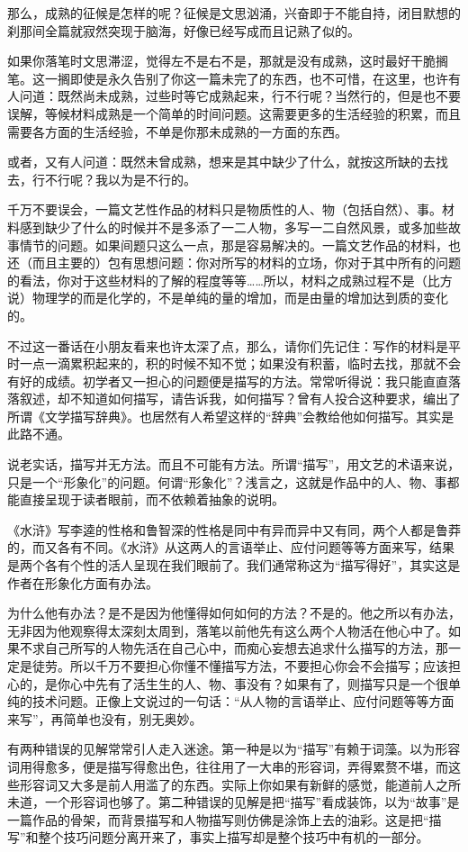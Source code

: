 \documentclass[fontset=fandol,12pt,a5paper]{ctexbook}
\begin{document}
那么，成熟的征候是怎样的呢？征候是文思汹涌，兴奋即于不能自持，闭目默想的刹那间全篇就寂然突现于脑海，好像已经写成而且记熟了似的。

如果你落笔时文思滞涩，觉得左不是右不是，那就是没有成熟，这时最好干脆搁笔。这一搁即使是永久告别了你这一篇未完了的东西，也不可惜，在这里，也许有人问道：既然尚未成熟，过些时等它成熟起来，行不行呢？当然行的，但是也不要误解，等候材料成熟是一个简单的时间问题。这需要更多的生活经验的积累，而且需要各方面的生活经验，不单是你那未成熟的一方面的东西。

或者，又有人问道：既然未曾成熟，想来是其中缺少了什么，就按这所缺的去找去，行不行呢？我以为是不行的。

千万不要误会，一篇文艺性作品的材料只是物质性的人、物（包括自然）、事。材料感到缺少了什么的时候并不是多添了一二人物，多写一二自然风景，或多加些故事情节的问题。如果间题只这么一点，那是容易解决的。一篇文艺作品的材料，也还（而且主要的）包有思想问题：你对所写的材料的立场，你对于其中所有的问题的看法，你对于这些材料的了解的程度等等……所以，材料之成熟过程不是（比方说）物理学的而是化学的，不是单纯的量的增加，而是由量的增加达到质的变化的。

不过这一番话在小朋友看来也许太深了点，那么，请你们先记住：写作的材料是平时一点一滴累积起来的，积的时候不知不觉；如果没有积蓄，临时去找，那就不会有好的成绩。初学者又一担心的问题便是描写的方法。常常听得说：我只能直直落落叙述，却不知道如何描写，请告诉我，如何描写？曾有人投合这种要求，编出了所谓《文学描写辞典》。也居然有人希望这样的“辞典”会教给他如何描写。其实是此路不通。

说老实话，描写并无方法。而且不可能有方法。所谓“描写”，用文艺的术语来说，只是一个“形象化”的问题。何谓“形象化”？浅言之，这就是作品中的人、物、事都能直接呈现于读者眼前，而不依赖着抽象的说明。

《水浒》写李逵的性格和鲁智深的性格是同中有异而异中又有同，两个人都是鲁莽的，而又各有不同。《水浒》从这两人的言语举止、应付问题等等方面来写，结果是两个各有个性的活人呈现在我们眼前了。我们通常称这为“描写得好”，其实这是作者在形象化方面有办法。

为什么他有办法？是不是因为他懂得如何如何的方法？不是的。他之所以有办法，无非因为他观察得太深刻太周到，落笔以前他先有这么两个人物活在他心中了。如果不求自己所写的人物先活在自己心中，而痴心妄想去追求什么描写的方法，那一定是徒劳。所以千万不要担心你懂不懂描写方法，不要担心你会不会描写；应该担心的，是你心中先有了活生生的人、物、事没有？如果有了，则描写只是一个很单纯的技术问题。正像上文说过的一句话：“从人物的言语举止、应付问题等等方面来写”，再简单也没有，别无奥妙。

有两种错误的见解常常引人走入迷途。第一种是以为“描写”有赖于词藻。以为形容词用得愈多，便是描写得愈出色，往往用了一大串的形容词，弄得累赘不堪，而这些形容词又大多是前人用滥了的东西。实际上你如果有新鲜的感觉，能道前人之所未道，一个形容词也够了。第二种错误的见解是把“描写”看成装饰，以为“故事”是一篇作品的骨架，而背景描写和人物描写则仿佛是涂饰上去的油彩。这是把“描写”和整个技巧问题分离开来了，事实上描写却是整个技巧中有机的一部分。
\end{document}
